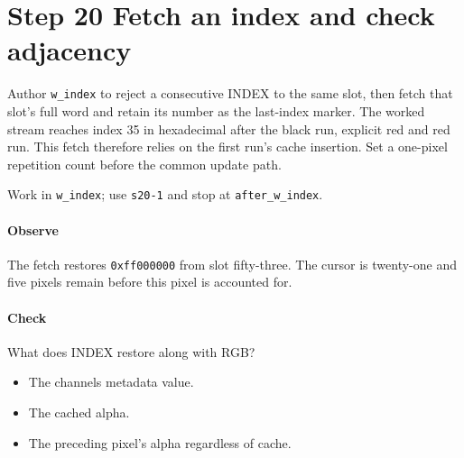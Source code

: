 \section{Step 20 Fetch an index and check adjacency}\label{qoi-s20}
Author \texttt{w\_index} to reject a consecutive INDEX to the same slot, then fetch that slot’s full word and retain its number as the last-index marker. The worked stream reaches index 35 in hexadecimal after the black run, explicit red and red run. This fetch therefore relies on the first run’s cache insertion. Set a one-pixel repetition count before the common update path.

Work in \texttt{w\_index}; use \texttt{s20-1} and stop at \texttt{after\_w\_index}.

\paragraph{Observe} The fetch restores \texttt{0xff000000} from slot fifty-three. The cursor is twenty-one and five pixels remain before this pixel is accounted for.

\paragraph{Check} What does INDEX restore along with RGB?
\begin{itemize}
\item[A.] The channels metadata value.
\item[B.] The cached alpha.
\item[C.] The preceding pixel’s alpha regardless of cache.
\end{itemize}
